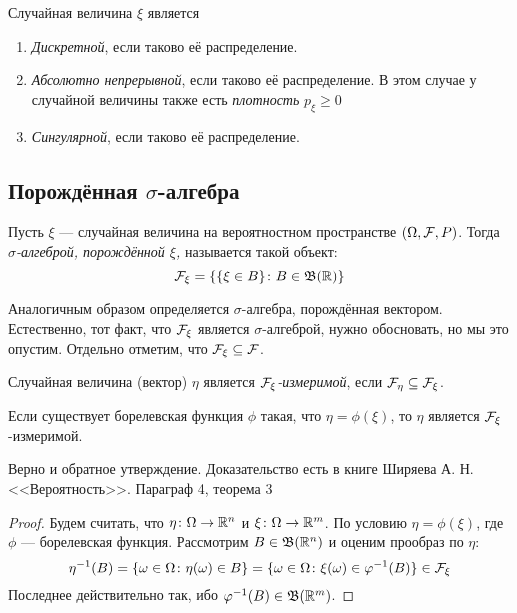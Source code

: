 Случайная величина $\xi$ является
\begin{enumerate}
	\item \textit{Дискретной}, если таково её распределение.
	
	\item \textit{Абсолютно непрерывной}, если таково её распределение. В этом случае у случайной величины также есть \textit{плотность} $p_\xi \ge 0$
	
	\item \textit{Сингулярной}, если таково её распределение.
\end{enumerate}

\subsection{Порождённая $\sigma$-алгебра}

\begin{definition}
	Пусть $\xi$ --- случайная величина на вероятностном пространстве $(\Omega, \mathcal{F}, P)$. Тогда \textit{$\sigma$-алгеброй, порождённой $\xi$,} называется такой объект:
	\[
		\mathcal{F}_\xi = \{\{\xi \in B\} \colon B \in \mathfrak{B}(\mathbb{R})\}
	\]
\end{definition}

\begin{note}
	Аналогичным образом определяется $\sigma$-алгебра, порождённая вектором. Естественно, тот факт, что $\mathcal{F}_\xi$ является $\sigma$-алгеброй, нужно обосновать, но мы это опустим. Отдельно отметим, что $\mathcal{F}_\xi \subseteq \mathcal{F}$.
\end{note}

\begin{definition}
	Случайная величина (вектор) $\eta$ является \textit{$\mathcal{F}_\xi$-измеримой}, если $\mathcal{F}_\eta \subseteq \mathcal{F}_\xi$.
\end{definition}

\begin{lemma}
	Если существует борелевская функция $\phi$ такая, что $\eta = \phi(\xi)$, то $\eta$ является $\mathcal{F}_\xi$-измеримой.
\end{lemma}

\begin{note}
	Верно и обратное утверждение. Доказательство есть в книге Ширяева А. Н. <<Вероятность>>. Параграф 4, теорема 3
\end{note}

\begin{proof}
	Будем считать, что $\eta \colon \Omega \to \mathbb{R}^n$ и $\xi \colon \Omega \to \mathbb{R}^m$. По условию $\eta = \phi(\xi)$, где $\phi$ --- борелевская функция. Рассмотрим $B \in \mathfrak{B}(\mathbb{R}^n)$ и оценим прообраз по $\eta$:
	\[
		\eta^{-1}(B) = \{\omega \in \Omega \colon \eta(\omega) \in B\} = \{\omega \in \Omega \colon \xi(\omega) \in \varphi^{-1}(B)\} \in \mathcal{F}_\xi
	\]
	Последнее действительно так, ибо $\varphi^{-1}(B) \in \mathfrak{B}(\mathbb{R}^m)$.
\end{proof}


